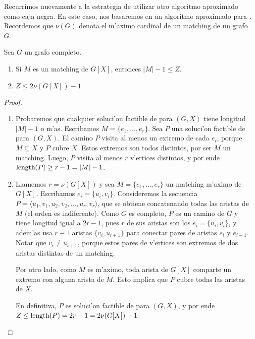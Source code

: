 Recurrimos nuevamente a la estrategia de utilizar otro algoritmo aproximado como caja negra. En este caso, nos basaremos en un algoritmo aproximado para . Recordemos que $\nu(G)$ denota el m'aximo cardinal de un matching de un grafo $G$.

\begin{lemma}
\label{le:sr_matching}
Sea $G$ un grafo completo.

\begin{enumerate}
\item Si $M$ es un matching de $G[X]$, entonces $|M| - 1 \leq Z$.
\item $Z \leq 2 \nu(G[X]) - 1$
\end{enumerate}

\begin{proof}
\hfill
\begin{enumerate}
\item Probaremos que cualquier soluci'on factible de  para $(G, X)$ tiene longitud $|M| - 1$ o m'as. Escribamos $M = \{e_1, \dots, e_r\}$. Sea $P$ una soluci'on factible de  para $(G, X)$. El camino $P$ visita al menos un extremo de cada $e_i$, porque $M \subseteq X$ y $P$ cubre $X$. Estos extremos son todos distintos, por ser $M$ un matching. Luego, $P$ visita al menos $r$ v'ertices distintos, y por ende $\textnormal{length}(P) \geq r - 1 = |M| - 1$.

\item Llamemos $r = \nu(G[X])$ y sea $M = \{e_1, \dots, e_r\}$ un matching m'aximo de $G[X]$. Escribamos $e_i = \{u_i, v_i\}$. Consideremos la secuencia $P = \langle u_1, v_1, u_2, v_2, \dots, u_r, v_r \rangle$, que se obtiene concatenando todas las aristas de $M$ (el orden es indiferente). Como $G$ es completo, $P$ es un camino de $G$ y tiene longitud igual a $2r - 1$, pues $r$ de sus aristas son los $e_i = \{u_i, v_i\}$, y adem'as usa $r - 1$ aristas $\{v_i, u_{i + 1}\}$ para conectar pares de aristas $e_i$ y $e_{i + 1}$. Notar que $v_i \neq u_{i + 1}$, porque estos pares de v'ertices son extremos de dos aristas distintas de un matching.

Por otro lado, como $M$ es m'aximo, toda arista de $G[X]$ comparte un extremo con alguna arista de $M$. Esto implica que $P$ cubre todas las aristas de $X$.

En definitiva, $P$ es soluci'on factible de  para $(G, X)$, y por ende $Z \leq \textnormal{length}(P) = 2r - 1 = 2\nu(G[X]) - 1$.
\end{enumerate}

\end{proof}
\end{lemma}

